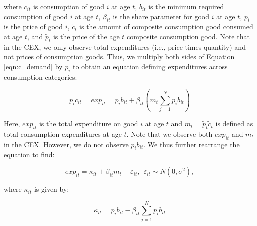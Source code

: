 \documentclass[article,11pt,letterpaper,fleqn]{article}
\theoremstyle{definition}
\numberwithin{equation}{section}
\begin{document}
\noindent\noindent where $c_{it}$ is consumption of good $i$ at age $t$, $b_{it}$ is the minimum required consumption of good $i$ at age $t$, $\beta_{it}$ is the share parameter for good $i$ at age $t$, $p_{i}$ is the price of good $i$, $\tilde{c}_{t}$ is the amount of composite consumption good consumed at age $t$, and $\tilde{p}_{t}$ is the price of the age $t$ composite consumption good.  Note that in the CEX, we only observe total expenditures (i.e., price times quantity) and not prices of consumption goods.  Thus, we multiply both sides of Equation \ref{eqn:c_demand} by $p_{i}$ to obtain an equation defining expenditures across consumption categories:

\begin{equation}
\label{eqn:cp_demand}
p_{i}c_{it}=exp_{it}=p_{i}b_{it} + \beta_{it}\left(m_{t}\sum_{j=1}^{N}p_{i}b_{it}\right)
\end{equation}

\noindent\noindent Here, $exp_{it}$ is the total expenditure on good $i$ at age $t$ and $m_{t}=\tilde{p}_{t}\tilde{c}_{t}$ is defined as total consumption expenditures at age $t$.  Note that we observe both $exp_{it}$ and $m_{t}$ in the CEX.  However, we do not observe $p_{i}b_{it}$.  We thus further rearrange the equation to find: 

\begin{equation}
\label{eqn:exp_eqn}
exp_{it}=\kappa_{it} + \beta_{it}m_{t}+\varepsilon_{it}, \ \ \varepsilon_{it}\sim N(0,\sigma^{2}),
\end{equation}

\noindent\noindent where $\kappa_{it}$ is given by:

\begin{equation}
\label{eqn:kappa}
\kappa_{it}=p_{i}b_{it} - \beta_{it}\sum_{j=1}^{N}p_{i}b_{it}
\end{equation}
\end{document}
